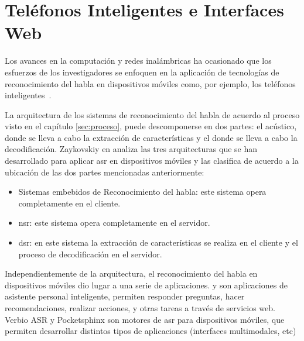 \section{Tel\'efonos Inteligentes e Interfaces Web}
\label{sec:smartphones}

Los avances en la computaci\'on y redes inal\'ambricas ha ocasionado
que los esfuerzos de los investigadores se enfoquen en la aplicaci\'on de tecnolog\'ias de
reconocimiento del habla en dispositivos m\'oviles como, por ejemplo, los tel\'efonos 
\mbox{inteligentes \cite{TanAutomatic2008}}.

La arquitectura de los sistemas de reconocimiento del habla de acuerdo al proceso visto en el 
cap\'itulo \ref{sec:proceso}, puede descomponerse en dos partes: el  ac\'ustico,
donde se lleva a cabo la extracci\'on de caracter\'isticas  y el  donde se 
lleva a cabo la decodificaci\'on. 
Zaykovskiy en \cite{ZaykovskiySurvey2006} analiza las tres arquitecturas que se han desarrollado
para aplicar \gls{asr} en dispositivos m\'oviles y las clasifica de acuerdo a la ubicaci\'on de las dos partes
mencionadas anteriormente:

\begin{itemize}
    \item Sistemas embebidos de Reconocimiento del habla: este sistema opera completamente en el cliente.
    \item \gls{nsr}: este sistema opera completamente en el servidor. 
    \item \gls{dsr}: en este sistema la extracci\'on de caracter\'isticas se realiza
        en el cliente y el proceso de decodificaci\'on en el servidor.
\end{itemize}

Independientemente de la arquitectura, el reconocimiento del habla en dispositivos m\'oviles dio lugar a una 
serie de aplicaciones.  \cite{AppleSiri, OneAccordSiri} y  \cite{GoogleNow} 
son aplicaciones de asistente personal inteligente, permiten responder preguntas,
hacer recomendaciones, realizar acciones, y otras tareas a trav\'es de servicios web. Verbio ASR \cite{VerbioASR} y 
Pocketsphinx \cite{HugginsDainesPocketSphinx2006, PocketSphinxHomePage} son motores de \gls{asr} para dispositivos
m\'oviles, que permiten desarrollar distintos tipos de aplicaciones (interfaces multimodales, etc)


